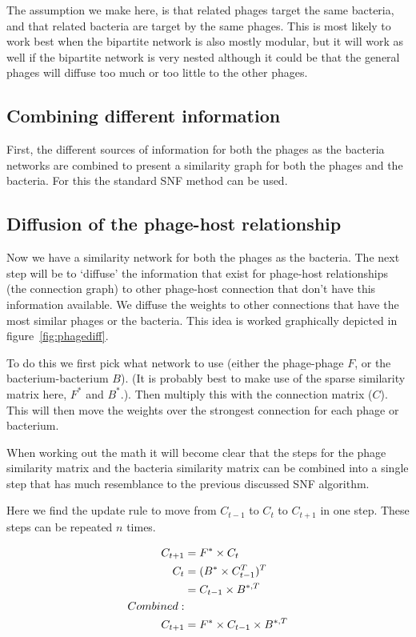 \documentclass{article}
\begin{document}
The assumption we make here, is that related phages target the same bacteria, 
and that related bacteria are target by the same phages. This is most likely
to work best when the bipartite network is also mostly modular, but it will
work as well if the bipartite network is very nested although it could be
that the general phages will diffuse too much or too little to the other phages.

\subsection{Combining different information}

First, the different sources of information for both the phages as the bacteria networks
are combined to present a similarity graph for both the phages and the bacteria.
For this the standard SNF method can be used.

\subsection{Diffusion of the phage-host relationship}

Now we have a similarity network for both the phages as the bacteria. 
The next step will be to `diffuse' the information that exist for phage-host 
relationships (the connection graph) 
to other phage-host connection that don't have this information
available.  
We diffuse the weights to other connections that have the most similar phages
or the bacteria. This idea is worked graphically depicted in figure~\ref{fig:phagediff}.

To do this we first pick what network to use (either the phage-phage $F$, or 
the bacterium-bacterium $B$). (It is probably best to make use of the sparse
similarity matrix here, $F^*$ and $B^*$.).
Then multiply this with the connection matrix ($C$). This will then move the
weights over the strongest connection for each phage or bacterium.

When working out the math it will become clear that the steps for the phage
similarity matrix and the bacteria similarity matrix can be combined into 
a single step that has much resemblance to the previous discussed SNF algorithm. 

\begin{minipage}{\textwidth}
Here we find the update rule to move from $C_{t-1}$ to $C_{t}$ to $C_{t+1}$ in 
one step. These steps can be repeated $n$ times.

\begin{align}
    \begin{split}
    C_{t+1} &= F^* \times C_t \\
    C_{t} &= (B^* \times C_{t - 1}^{T})^{T} \\
          &= C_{t - 1} \times B^{*,T} \\
    \hfil Combined: \\
    C_{t+1} &= F^* \times C_{t - 1} \times B^{*,T}
    \end{split}
\end{align}

\end{minipage}
\end{document}
